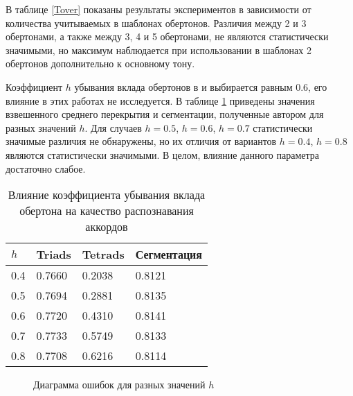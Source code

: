 В таблице \ref{Tover} показаны результаты экспериментов в зависимости от
количества учитываемых в шаблонах обертонов. Различия между 2 и 3 обертонами, а
также между 3, 4 и 5 обертонами, не являются статистически значимыми, но
максимум наблюдается при использовании в шаблонах 2 обертонов дополнительно к
основному тону.

Коэффициент $h$ убывания вклада обертонов в \cite{Gomez2006} и \cite{Oudre2009}
выбирается равным 0.6, его влияние в этих работах не исследуется. В таблице
\ref{Th} приведены значения взвешенного среднего перекрытия и сегментации,
полученные автором для разных значений $h$. Для случаев $h=0.5$, $h=0.6$,
$h=0.7$ статистически значимые различия не обнаружены, но их отличия от
вариантов $h=0.4$, $h=0.8$ являются статистически значимыми. В целом, влияние
данного параметра достаточно слабое.

\begin{table} [htbp]
  \centering
  \parbox{15cm}{\caption{Влияние коэффициента убывания вклада обертона на
  качество распознавания аккордов} \label{Th}}
  \begin{tabular}{|l|l|l|l|}
  \hline
  $h$ & Triads & Tetrads & Сегментация \\
  \hline
  0.4 & 0.7660 & 0.2038 & 0.8121 \\
  0.5 & 0.7694 & 0.2881 & 0.8135 \\
  0.6 & 0.7720 & 0.4310 & 0.8141 \\
  0.7 & 0.7733 & 0.5749 & 0.8133 \\
  0.8 & 0.7708 & 0.6216 & 0.8114 \\
  \hline
  \end{tabular}
\end{table}

\begin{figure}[h]
  \begin{minipage}[h]{0.49\linewidth}
  \end{minipage}
  \hfill
  \begin{minipage}[h]{0.49\linewidth}
  \end{minipage}
  \caption{Диаграмма ошибок для разных значений $h$}
  \label{img:h}
\end{figure}

